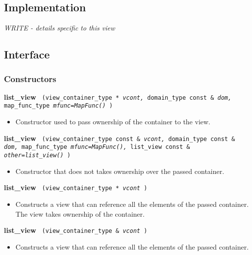 \subsection{Implementation}

\textit{WRITE - details specific to this view}

\subsection{Interface} \label{sec-list-vw-inter}

\subsubsection{Constructors}

\noindent
\textbf{list\_view}%
\texttt{%
(view\_container\_type *
\textit{vcont,}%
domain\_type const \&
\textit{dom,}%
    map\_func\_type
\textit{mfunc=MapFunc()}%
)
}

\begin{itemize}
\item
Constructor used to pass ownership of the container to the view.
\end{itemize}

\noindent
\textbf{list\_view}%
\texttt{%
(view\_container\_type const \&
\textit{vcont,}%
domain\_type const \&
\textit{dom,}%
map\_func\_type
\textit{mfunc=MapFunc(),}%
list\_view const \&
\textit{other=list\_view()}%
)
}

\begin{itemize}
\item
Constructor that does not takes ownership over the passed container.
\end{itemize}

\noindent
\textbf{list\_view}%
\texttt{%
(view\_container\_type *
\textit{vcont}%
)
}

\begin{itemize}
\item
Constructs a view that can reference all the elements of the passed container. The view takes ownership of the container.
\end{itemize}

\noindent
\textbf{list\_view}%
\texttt{%
(view\_container\_type \&
\textit{vcont}%
)
}

\begin{itemize}
\item
Constructs a view that can reference all the elements of the passed container.
\end{itemize}

